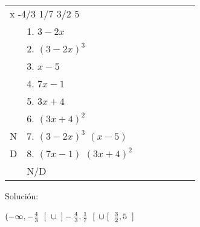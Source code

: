 \documentclass[12pt]{article}
\begin{document}
\begin{table}
\centering
\begin{tabular}{l|l|l|l|l|l|l|l}
\multicolumn{8}{l}{\hspace{2cm} x \hspace{2.4cm} {\tiny{-4/3}} \hspace{.2cm} {\tiny{1/7}} \hspace{.05cm} {\tiny{3/2}} \hspace{.2cm} {\tiny{5}} }                                                      \\ 
\cline{2-7}
                        & 1. $3-2x$                & {\blue{+}} & {\blue{+}} & {\blue{+}} & {\red{$-$}} & {\red{$-$}} &   \\ 
\cline{2-7}
                        & 2. $(3-2x)^{3}$          & {\blue{+}} & {\blue{+}} & {\blue{+}} & {\red{$-$}} & {\red{$-$}} &   \\ 
\cline{2-7}
                        & 3. $x-5$                 & {\red{$-$}} & {\red{$-$}} & {\red{$-$}} & {\red{$-$}} & {\blue{+}} &   \\ 
\cline{2-7}
                        & 4. $7x-1$                & {\red{$-$}} & {\red{$-$}} & {\blue{+}} & {\blue{+}} & {\blue{+}} &   \\ 
\cline{2-7}
                        & 5. $3x+4$                & {\red{$-$}} & {\blue{+}} & {\blue{+}} & {\blue{+}} & {\blue{+}} &   \\ 
\cline{2-7}
                        & 6. $(3x+4)^{2}$          & {\blue{+}} & {\blue{+}} & {\blue{+}} & {\blue{+}} & {\blue{+}} &   \\ 
\cline{1-7}
\multicolumn{1}{|l|}{N} & 7. $(3-2x)^{3}$ $(x-5)$  & {\red{$-$}} & {\red{$-$}} & {\red{$-$}} & {\blue{+}} & {\red{$-$}} &   \\ 
\cline{1-7}
\multicolumn{1}{|l|}{D} & 8. $(7x-1)$ $(3x+4)^{2}$ & {\red{$-$}}& {\red{$-$}} & {\blue{+}} & {\blue{+}} & {\blue{+}} &   \\ 
\cline{1-7}
                        & N/D                      & {\blue{+}} & {\blue{+}} & {\red{$-$}} & {\blue{+}} & {\red{$-$}} &   \\
\cline{2-7}
\end{tabular}
\end{table} \vspace{1cm}

Solución: 

\begin{center}
    $ (-\infty, -\frac{4}{3}\hspace{0.2cm}[\hspace{0.2cm}\cup$ $]-\frac{4}{3}, \frac{1}{7}\hspace{0.2cm}[$ $\cup\hspace{0.1cm} [\hspace{0.2cm}\frac{3}{2}, 5 \hspace{0.2cm}]$
\end{center} \vspace{.5cm}
\end{document}
